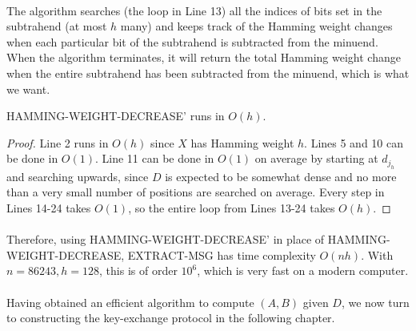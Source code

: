\paragraph{}
The algorithm searches (the loop in Line 13) all the indices of bits set in the subtrahend (at most $h$ many) and keeps track of the Hamming weight changes when each particular bit of the subtrahend is subtracted from the minuend. When the algorithm terminates, it will return the total Hamming weight change when the entire subtrahend has been subtracted from the minuend, which is what we want.

\begin{claim}
HAMMING-WEIGHT-DECREASE' runs in $O(h)$.
\end{claim}
\begin{proof}
Line 2 runs in $O(h)$ since $X$ has Hamming weight $h$.
Lines 5 and 10 can be done in $O(1)$.
Line 11 can be done in $O(1)$ on average by starting at $d_{j_h}$ and searching upwards, since $D$ is expected to be somewhat dense and no more than a very small number of positions are searched on average.
Every step in Lines 14-24 takes $O(1)$, so the entire loop from Lines 13-24 takes $O(h)$.
\end{proof}

\paragraph{}
Therefore, using HAMMING-WEIGHT-DECREASE' in place of HAMMING-WEIGHT-DECREASE, EXTRACT-MSG has time complexity $O(nh)$. With $n = 86243, h = 128$, this is of order $10^6$, which is very fast on a modern computer.

\paragraph{}
Having obtained an efficient algorithm to compute $(A,B)$ given $D$, we now turn to constructing the key-exchange protocol in the following chapter.